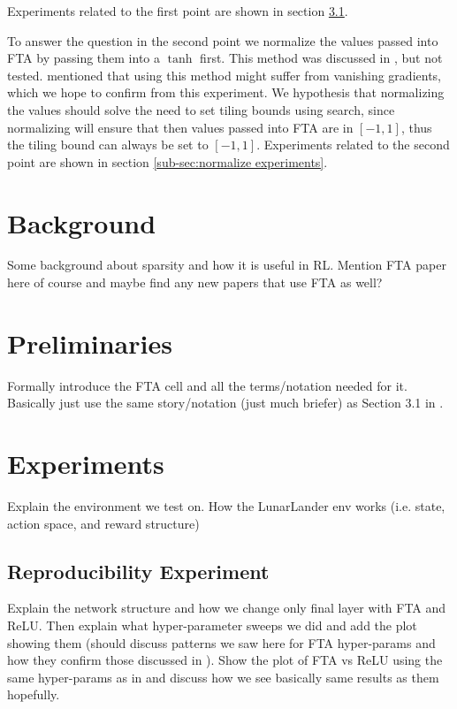 \documentclass{article}
\begin{document}
Experiments related to the first point are shown in section \ref{sub-sec:reproduc experiments}. 

To answer the question in the second point we normalize the values passed into FTA by passing them into a $\tanh$ first.
This method was discussed in \cite{pan2019fuzzy}, but not tested.
\cite{pan2019fuzzy} mentioned that using this method might suffer from vanishing gradients, which we hope to confirm from this experiment.
We hypothesis that normalizing the values should solve the need to set tiling bounds using search, since normalizing will ensure that then values passed into FTA are in $[-1, 1]$, thus the tiling bound can always be set to $[-1, 1]$.
Experiments related to the second point are shown in section \ref{sub-sec:normalize experiments}. 


\section{Background} \label{sec:background}
Some background about sparsity and how it is useful in RL. 
Mention FTA paper here of course and maybe find any new papers that use FTA as well?


\section{Preliminaries} \label{sec:prelims}
Formally introduce the FTA cell and all the terms/notation needed for it. 
Basically just use the same story/notation (just much briefer) as Section 3.1 in \cite[]{pan2019fuzzy}.


\section{Experiments} \label{sec:experiments}
Explain the environment we test on. 
How the LunarLander env works (i.e. state, action space, and reward structure)

\subsection{Reproducibility Experiment} \label{sub-sec:reproduc experiments}
Explain the network structure and how we change only final layer with FTA and ReLU.
Then explain what hyper-parameter sweeps we did and add the plot showing them (should discuss patterns we saw here for FTA hyper-params and how they confirm those discussed in \cite[]{pan2019fuzzy}).
Show the plot of FTA vs ReLU using the same hyper-params as in \cite[]{pan2019fuzzy} and discuss how we see basically same results as them hopefully.
\end{document}
